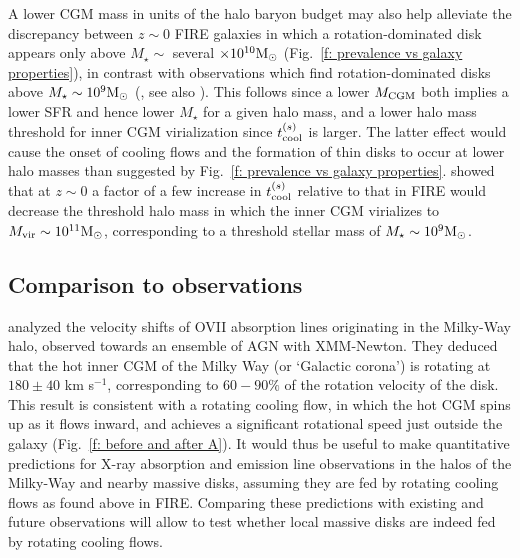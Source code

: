 \documentclass[fleqn,usenatbib]{mnras}
\newcommand{\msun}{{\rm M}_\odot}
\begin{document}
A lower CGM mass in units of the halo baryon budget may also help alleviate the discrepancy between $z\sim0$ FIRE galaxies in which a rotation-dominated disk appears only above $M_\star\sim$ several $\times 10^{10}\msun$ (Fig.~\ref{f: prevalence vs galaxy properties}), in contrast with observations which find rotation-dominated
disks above $M_\star\sim10^9\msun$ (\citealt{El-Badry2018, El-Badry2018a}, see also \citealt{Peebles2020}).
This follows since a lower $M_{\rm CGM}$ both implies a lower SFR and hence lower $M_\star$ for a given halo mass, and a lower halo mass threshold for inner CGM virialization since $t_{\rm cool}^{(s)}$ is larger.
The latter effect would cause the onset of cooling flows and the formation of thin disks to occur at lower halo masses than suggested by Fig.~\ref{f: prevalence vs galaxy properties}.
\cite{Stern2021} showed that at $z\sim0$ a factor of a few increase in $t_{\rm cool}^{(s)}$ relative to that in FIRE would decrease the threshold halo mass in which the inner CGM virializes to $M_{\rm vir}\sim10^{11}\msun$, corresponding to a threshold stellar mass of $M_\star\sim10^9\msun$.

\subsection{Comparison to observations}

\cite{Hodges-Kluck2016} analyzed the velocity shifts of O{\sc VII} absorption lines originating in the Milky-Way halo, observed towards an ensemble of AGN with XMM-Newton.
They deduced that the hot inner CGM of the Milky Way (or `Galactic corona') is rotating at $180\pm40$ km s$^{-1}$, corresponding to $60-90\%$ of the rotation velocity of the disk.
This result is consistent with a rotating cooling flow, in which the hot CGM spins up as it flows inward, and achieves a significant rotational speed just outside the galaxy (Fig.~\ref{f: before and after A}).
It would thus be useful to make quantitative predictions for X-ray absorption and emission line observations in the halos of the Milky-Way and nearby massive disks, assuming they are fed by rotating cooling flows as found above in FIRE.
Comparing these predictions with existing and future observations \citep[e.g. with Lynx,][]{TheLynxTeam2018} will allow to test whether local massive disks are indeed fed by rotating cooling flows. 
\end{document}
